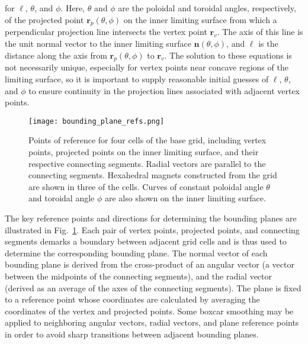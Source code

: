 \documentclass[11pt,onecolumn]{article}
\begin{document}
\noindent for $\ell$, $\theta$, and $\phi$. Here, $\theta$ and $\phi$ are 
the poloidal and toroidal angles, respectively, of the projected point 
$\mathbf{r}_p(\theta,\phi)$ on the inner limiting surface from which a 
perpendicular projection line intersects the vertex point $\mathbf{r}_v$.
The axis of this line is the unit normal vector to the inner limiting surface
$\mathbf{\hat{n}}(\theta,\phi)$, and $\ell$ is the distance along the axis
from $\mathbf{r}_p(\theta,\phi)$ to $\mathbf{r}_v$. The solution to these 
equations is not necessarily unique, especially for vertex points near 
concave regions of the limiting surface, so it is important to supply 
reasonable initial guesses of $\ell$, $\theta$, and $\phi$ to ensure 
continuity in the projection lines associated with adjacent vertex points.

\begin{figure}
    \begin{center}
    \texttt{[image: bounding\_plane\_refs.png]}
    \caption{Points of reference for four cells of the base grid, including
             vertex points, projected points on the inner limiting surface, and
             their respective connecting segments. Radial vectors are parallel 
             to the connecting segments. Hexahedral magnets constructed from
             the grid are shown in three of the cells. Curves of constant
             poloidal angle $\theta$ and toroidal angle $\phi$ are also shown on
             the inner limiting surface.}
    \label{fig:bounding_plane_refs} 
    \end{center}
\end{figure}

The key reference points and directions for determining the bounding planes
are illustrated in Fig.~\ref{fig:bounding_plane_refs}.
Each pair of vertex points, projected points, and connecting segments demarks
a boundary between adjacent grid cells and is thus used to determine the 
corresponding bounding plane. The normal vector of each bounding plane is
derived from the cross-product of an angular vector (a vector between the 
midpoints of the connecting segments), and the radial vector (derived 
as an average of the axes of the connecting segments). The plane is fixed
to a reference point whose coordinates are calculated by averaging the
coordinates of the vertex and projected points. Some boxcar smoothing may be
applied to neighboring angular vectors, radial vectors, and plane reference
points in order to avoid sharp transitions between adjacent bounding planes.
\end{document}
